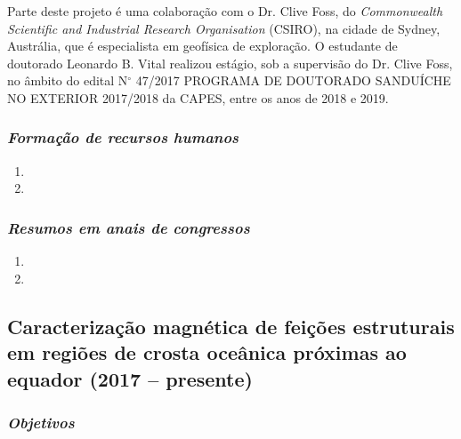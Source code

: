 Parte deste projeto é uma colaboração com o Dr. Clive Foss, do \textit{Commonwealth 
Scientific and Industrial Research Organisation} (CSIRO), na cidade de Sydney, Austrália, 
que é especialista em geofísica de exploração. O estudante de doutorado Leonardo B. Vital 
realizou estágio, sob a supervisão do Dr. Clive Foss, no âmbito do edital N$^{\circ}$ 
47/2017 PROGRAMA DE DOUTORADO SANDUÍCHE NO EXTERIOR 2017/2018 da CAPES, entre os anos 
de 2018 e 2019.

\subsubsection{\emph{Formação de recursos humanos}}

\begin{enumerate}
	
	\item{}
	
	\item{}
	
\end{enumerate}

\subsubsection{\emph{Resumos em anais de congressos}}

\begin{enumerate}
	\item {}
	\item {}
\end{enumerate}


\subsection{Caracterização magnética de feições estruturais em regiões de crosta oceânica próximas ao equador (2017 -- presente)} \label{projeto-baixas-latitudes}

\subsubsection{\emph{Objetivos}}

